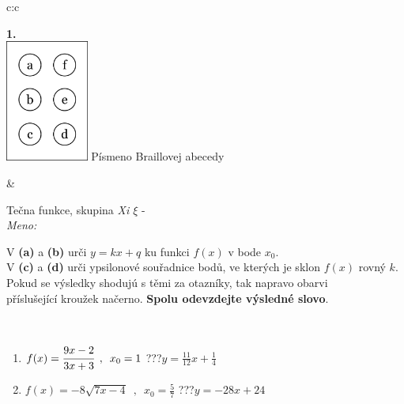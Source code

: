 \documentclass[10pt]{report}
\begin{document}
\begin{tabular}{c:c}
\begin{minipage}[c][104.5mm][t]{0.5\linewidth}
\begin{center}
\begin{minipage}{0.20\linewidth}
\begin{center}
{\Huge\bfseries 1.} \\[2mm]
\includegraphics[height=40mm]{../images/braille.png}
{\small Písmeno Braillovej abecedy}
\end{center}
\end{minipage}
\end{center}
\end{minipage}
&
\begin{minipage}[c][104.5mm][t]{0.5\linewidth}
\begin{center}
\vspace{7mm}
{\huge Tečna funkce, skupina \textit{Xi $\xi$} -}\\[5mm]
\textit{Meno:}\phantom{xxxxxxxxxxxxxxxxxxxxxxxxxxxxxxxxxxxxxxxxxxxxxxxxxxxxxxxxxxxxxxxxx}\\[5mm]
\begin{minipage}{0.95\linewidth}
\begin{center}
V \textbf{(a)} a \textbf{(b)} urči  $y = kx + q$ ku funkci $f(x)$ v bode $x_0$.\\V \textbf{(c)} a \textbf{(d)} urči ypsilonové souřadnice bodů, ve kterých je sklon $f(x)$ rovný $k$.\\Pokud se výsledky shodujú s těmi za otazníky, tak napravo obarvi\\příslušející kroužek načerno. \textbf{Spolu odevzdejte výsledné slovo}.
\end{center}
\end{minipage}
\\[1mm]
\begin{minipage}{0.79\linewidth}
\begin{center}
\begin{varwidth}{\linewidth}
\begin{enumerate}
\small
\item $f(x)=\cfrac{9x-2}{3x+3}\enspace , \enspace x_0=1$\quad \dotfill\; ???\;\dotfill \quad $y = \frac{11}{12}x+\frac{1}{4}$
\item $f(x)=-8\sqrt{7x-4}\enspace , \enspace x_0=\frac{5}{7}$\quad \dotfill\; ???\;\dotfill \quad $y = -28x+24$

\end{enumerate}
\end{varwidth}
\end{center}
\end{minipage}
\end{center}
\end{minipage}
\end{tabular}
\end{document}
